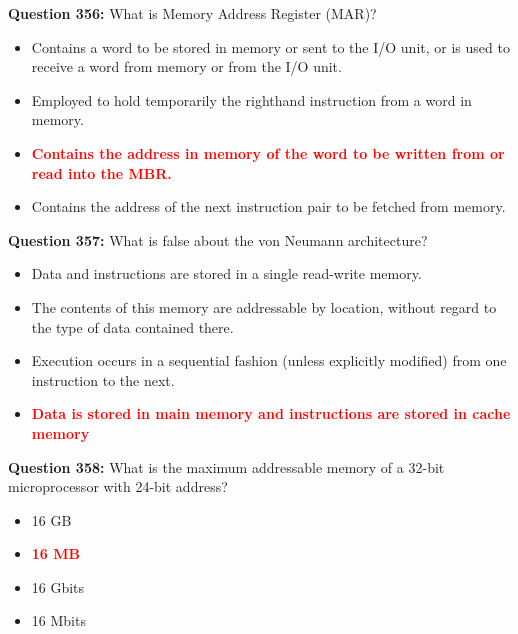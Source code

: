 \documentclass[12pt,a4paper]{article}
\begin{document}
\vspace{0.5cm}

\textbf{Question 356:} What is Memory Address Register (MAR)?

\begin{itemize}
    \item[\textbf{A.}] Contains a word to be stored in memory or sent to the I/O unit, or is used to receive a word from memory or from the I/O unit.
    \item[\textbf{B.}] Employed to hold temporarily the righthand instruction from a word in memory.
    \item[\textbf{C.}] \textcolor{red}{\textbf{Contains the address in memory of the word to be written from or read into the MBR.}}
    \item[\textbf{D.}] Contains the address of the next instruction pair to be fetched from memory.
\end{itemize}

\vspace{0.5cm}

\textbf{Question 357:} What is false about the von Neumann architecture?

\begin{itemize}
    \item[\textbf{A.}] Data and instructions are stored in a single read-write memory.
    \item[\textbf{B.}] The contents of this memory are addressable by location, without regard to the type of data contained there.
    \item[\textbf{C.}] Execution occurs in a sequential fashion (unless explicitly modified) from one instruction to the next.
    \item[\textbf{D.}] \textcolor{red}{\textbf{Data is stored in main memory and instructions are stored in cache memory}}
\end{itemize}

\vspace{0.5cm}

\textbf{Question 358:} What is the maximum addressable memory of a 32-bit microprocessor with 24-bit address?

\begin{itemize}
    \item[\textbf{A.}] 16 GB
    \item[\textbf{B.}] \textcolor{red}{\textbf{16 MB}}
    \item[\textbf{C.}] 16 Gbits
    \item[\textbf{D.}] 16 Mbits
\end{itemize}
\end{document}
